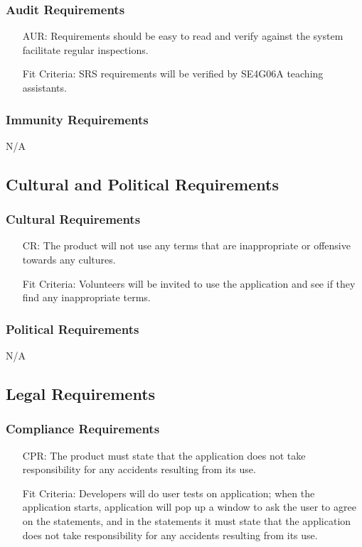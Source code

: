 \documentclass[12pt]{article}
\newcounter{reqnum} %
\newcounter{aurreqnum} %
\newcounter{crreqnum} %
\newcounter{cprreqnum} %
\begin{document}
\subsubsection{Audit Requirements}
\begin{itemize}
    \item[AUR\refstepcounter{aurreqnum}\theaurreqnum \label{R_Inputs}:] Requirements should be easy to read and verify against the system facilitate regular inspections.
    \item[] Fit Criteria: SRS requirements will be verified by SE4G06A teaching assistants.
\end{itemize}

\subsubsection{Immunity Requirements}
N/A

\subsection{Cultural and Political Requirements}
\subsubsection{Cultural Requirements}
\begin{itemize}
    \item[CR\refstepcounter{crreqnum}\thecrreqnum \label{R_Inputs}:] The product will not use any terms that are inappropriate or offensive towards any cultures.
    \item[] Fit Criteria: Volunteers will be invited to use the application and see if they find any inappropriate terms.
\end{itemize}

\subsubsection{Political Requirements}
N/A

\subsection{Legal Requirements}
\subsubsection{Compliance Requirements}
\begin{itemize}
    \item[CPR\refstepcounter{cprreqnum}\thecprreqnum \label{R_Inputs}:] The product must state that the application does not take responsibility for any accidents resulting from its use. 
    \item[] Fit Criteria: Developers will do user tests on application; when the application starts, application will pop up a window to ask the user to agree on the statements, and in the statements it must state that the application does not take responsibility for any accidents resulting from its use.
\end{itemize}
\end{document}
